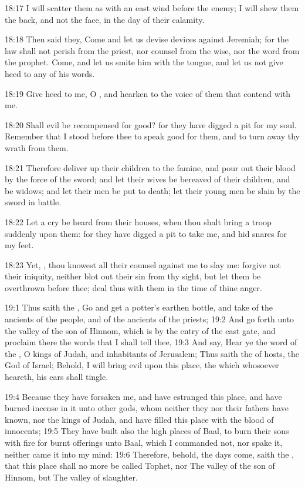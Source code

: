 18:17 I will scatter them as with an east wind before the enemy; I
will shew them the back, and not the face, in the day of their
calamity.

18:18 Then said they, Come and let us devise devices against Jeremiah;
for the law shall not perish from the priest, nor counsel from the
wise, nor the word from the prophet. Come, and let us smite him with
the tongue, and let us not give heed to any of his words.

18:19 Give heed to me, O \LORD, and hearken to the voice of them that
contend with me.

18:20 Shall evil be recompensed for good? for they have digged a pit
for my soul. Remember that I stood before thee to speak good for them,
and to turn away thy wrath from them.

18:21 Therefore deliver up their children to the famine, and pour out
their blood by the force of the sword; and let their wives be bereaved
of their children, and be widows; and let their men be put to death;
let their young men be slain by the sword in battle.

18:22 Let a cry be heard from their houses, when thou shalt bring a
troop suddenly upon them: for they have digged a pit to take me, and
hid snares for my feet.

18:23 Yet, \LORD, thou knowest all their counsel against me to slay me:
forgive not their iniquity, neither blot out their sin from thy sight,
but let them be overthrown before thee; deal thus with them in the
time of thine anger.

19:1 Thus saith the \LORD, Go and get a potter's earthen bottle, and
take of the ancients of the people, and of the ancients of the
priests; 19:2 And go forth unto the valley of the son of Hinnom, which
is by the entry of the east gate, and proclaim there the words that I
shall tell thee, 19:3 And say, Hear ye the word of the \LORD, O kings
of Judah, and inhabitants of Jerusalem; Thus saith the \LORD of hosts,
the God of Israel; Behold, I will bring evil upon this place, the
which whosoever heareth, his ears shall tingle.

19:4 Because they have forsaken me, and have estranged this place, and
have burned incense in it unto other gods, whom neither they nor their
fathers have known, nor the kings of Judah, and have filled this place
with the blood of innocents; 19:5 They have built also the high places
of Baal, to burn their sons with fire for burnt offerings unto Baal,
which I commanded not, nor spake it, neither came it into my mind:
19:6 Therefore, behold, the days come, saith the \LORD, that this place
shall no more be called Tophet, nor The valley of the son of Hinnom,
but The valley of slaughter.

